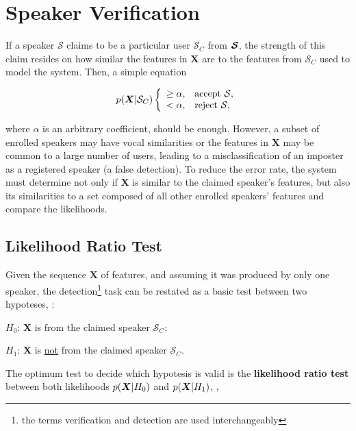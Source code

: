 \section{Speaker Verification}
\label{sec:speaker-verification}

If a speaker $\mathcal{S}$ claims to be a particular user $\mathcal{S}_{C}$ from $\boldsymbol{\mathcal{S}}$, the strength of this claim resides on how similar the features in $\boldsymbol{X}$ are to the features from $\mathcal{S}_{C}$ used to model the system. Then, a simple equation

\begin{equation}
    \postpdf{\boldsymbol{X}}{\mathcal{S}_{C}} \verifytestB{\alpha}{\mathcal{S}}
    \label{eq:decision_speaker_verification}
\end{equation}

\noindent where $\alpha$ is an arbitrary coefficient, should be enough. However, a subset of enrolled speakers may have vocal similarities or the features in $\boldsymbol{X}$ may be common to a large number of users, leading to a misclassification of an imposter as a registered speaker (a false detection). To reduce the error rate, the system must determine not only if $\boldsymbol{X}$ is similar to the claimed speaker's features, but also its similarities to a set composed of all other enrolled speakers' features and compare the likelihoods.

\subsection{Likelihood Ratio Test}

Given the sequence $\boldsymbol{X}$ of features, and assuming it was produced by only one speaker, the detection\footnote{the terms verification and detection are used interchangeably} task can be restated as a basic test between two hypoteses, :

\begin{description}\itemsep0pt
    \item $H_0$: $\boldsymbol{X}$ is from the claimed speaker $\mathcal{S}_{C}$;
    \item $H_1$: $\boldsymbol{X}$ is \underline{not} from the claimed speaker $\mathcal{S}_{C}$.
\end{description}

\noindent The optimum test to decide which hypotesis is valid is the \textbf{likelihood ratio test} between both likelihoods $p(\boldsymbol{X}|H_0)$ and $p(\boldsymbol{X}|H_1)$, ,

